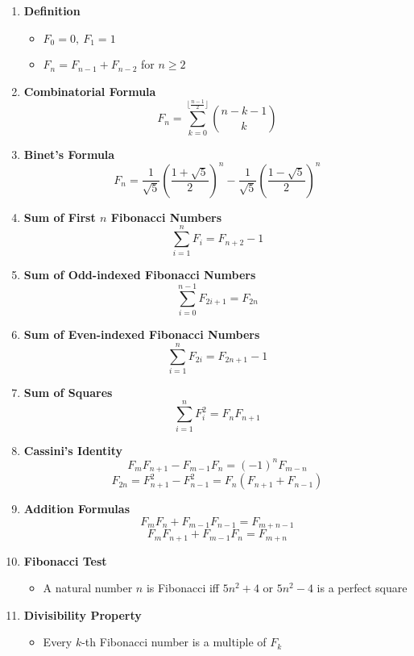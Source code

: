 \begin{enumerate}[leftmargin=*]
    \item \textbf{Definition}
        \begin{itemize}
            \item $F_0 = 0,\ F_1 = 1$
            \item $F_n = F_{n-1} + F_{n-2}$ for $n \geq 2$
        \end{itemize}
    
    \item \textbf{Combinatorial Formula}
        \[F_n = \sum_{k=0}^{\lfloor\frac{n-1}{2}\rfloor} \binom{n-k-1}{k}\]
    
    \item \textbf{Binet's Formula}
        \[F_n = \frac{1}{\sqrt{5}}\left(\frac{1+\sqrt{5}}{2}\right)^n - \frac{1}{\sqrt{5}}\left(\frac{1-\sqrt{5}}{2}\right)^n\]
    
    \item \textbf{Sum of First $n$ Fibonacci Numbers}
        \[\sum_{i=1}^n F_i = F_{n+2} - 1\]
    
    \item \textbf{Sum of Odd-indexed Fibonacci Numbers}
        \[\sum_{i=0}^{n-1} F_{2i+1} = F_{2n}\]
    
    \item \textbf{Sum of Even-indexed Fibonacci Numbers}
        \[\sum_{i=1}^n F_{2i} = F_{2n+1} - 1\]
    
    \item \textbf{Sum of Squares}
        \[\sum_{i=1}^n F_i^2 = F_n F_{n+1}\]
    
    \item \textbf{Cassini's Identity}
        \[F_m F_{n+1} - F_{m-1} F_n = (-1)^n F_{m-n}\]
        \[F_{2n} = F_{n+1}^2 - F_{n-1}^2 = F_n(F_{n+1} + F_{n-1})\]
    
    \item \textbf{Addition Formulas}
        \[F_m F_n + F_{m-1} F_{n-1} = F_{m+n-1}\]
        \[F_m F_{n+1} + F_{m-1} F_n = F_{m+n}\]
    
    \item \textbf{Fibonacci Test}
        \begin{itemize}
            \item A natural number $n$ is Fibonacci iff $5n^2 + 4$ or $5n^2 - 4$ is a perfect square
        \end{itemize}
    
    \item \textbf{Divisibility Property}
        \begin{itemize}
            \item Every $k$-th Fibonacci number is a multiple of $F_k$
        \end{itemize}
    

\end{enumerate}
